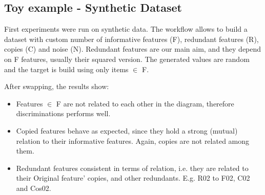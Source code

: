 \subsection{Toy example - Synthetic Dataset}
First experiments were run on synthetic data. The workflow allows to build a dataset with custom number of informative features (F), redundant features (R), copies (C) and noise (N). Redundant features are our main aim, and they depend on F features, usually their squared version. The generated values are random and the target is build using only items $\in$ F.

After swapping, the results show:

\begin{itemize}
    \item Features $\in$ F are not related to each other in the diagram, therefore discriminations performs well.
    \item Copied features behave as expected, since they hold a strong (mutual) relation to their informative features. Again, copies are not related among them.
    \item Redundant features consistent in terms of relation, i.e. they are related to their Original feature’ copies, and other redundants. E.g. R02 to F02, C02 and Cos02.
\end{itemize}

